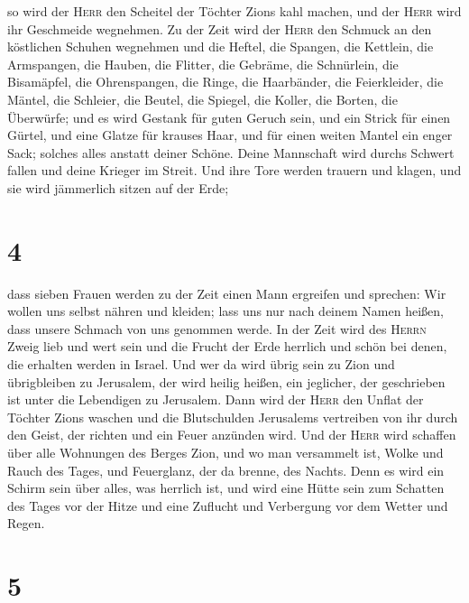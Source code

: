  so wird der \textsc{Herr} den Scheitel der Töchter Zions
kahl machen, und der \textsc{Herr} wird ihr Geschmeide wegnehmen.
 Zu der Zeit wird der \textsc{Herr} den Schmuck an den
köstlichen Schuhen wegnehmen und die Heftel, die Spangen,
 die Kettlein, die Armspangen, die Hauben,
 die Flitter, die Gebräme, die Schnürlein, die
Bisamäpfel, die Ohrenspangen,  die Ringe, die Haarbänder,
 die Feierkleider, die Mäntel, die Schleier, die Beutel,
 die Spiegel, die Koller, die Borten, die Überwürfe;
 und es wird Gestank für guten Geruch sein, und ein
Strick für einen Gürtel, und eine Glatze für krauses Haar, und für einen
weiten Mantel ein enger Sack; solches alles anstatt deiner Schöne.
 Deine Mannschaft wird durchs Schwert fallen und deine
Krieger im Streit.  Und ihre Tore werden trauern und
klagen, und sie wird jämmerlich sitzen auf der Erde;

\hypertarget{section-3}{%
\section{4}\label{section-3}}

 dass sieben Frauen werden zu der Zeit einen Mann
ergreifen und sprechen: Wir wollen uns selbst nähren und kleiden; lass
uns nur nach deinem Namen heißen, dass unsere Schmach von uns genommen
werde.  In der Zeit wird des \textsc{Herrn} Zweig lieb und
wert sein und die Frucht der Erde herrlich und schön bei denen, die
erhalten werden in Israel.  Und wer da wird übrig sein zu
Zion und übrigbleiben zu Jerusalem, der wird heilig heißen, ein
jeglicher, der geschrieben ist unter die Lebendigen zu Jerusalem.
 Dann wird der \textsc{Herr} den Unflat der Töchter Zions
waschen und die Blutschulden Jerusalems vertreiben von ihr durch den
Geist, der richten und ein Feuer anzünden wird.  Und der
\textsc{Herr} wird schaffen über alle Wohnungen des Berges Zion, und wo
man versammelt ist, Wolke und Rauch des Tages, und Feuerglanz, der da
brenne, des Nachts. Denn es wird ein Schirm sein über alles, was
herrlich ist,  und wird eine Hütte sein zum Schatten des
Tages vor der Hitze und eine Zuflucht und Verbergung vor dem Wetter und
Regen.

\hypertarget{section-4}{%
\section{5}\label{section-4}}


